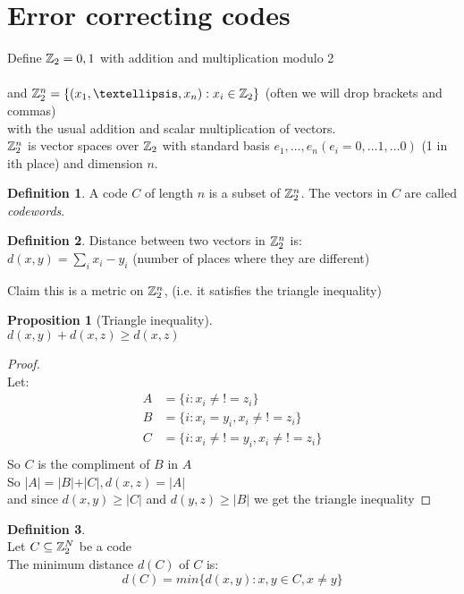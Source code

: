 \documentclass[]{article}
\newtheorem{prop}[thm]{Proposition}
\theoremstyle{definition}
\newtheorem*{defn}{Definition}
\theoremstyle{remark}
\numberwithin{equation}{section}
\begin{document}
\section{Error correcting codes}
	Define $\mathbb{Z}_2 = {0,1}$ with addition and multiplication modulo 2\\
	\\
	and $\ZZb^n = \{(x_1,…, x_n): x_i \in \ZZb\}$ (often we will drop brackets and commas)\\ with the usual addition and scalar multiplication of vectors.\\
	$\mathbb{Z}_2^n$ is vector spaces over $\mathbb{Z}_2$ with standard basis $e_1, …,e_n (e_i = 0,…1,…0)$ (1 in ith place) and dimension $n$.

	\begin{defn}
		 A code $C$ of length $n$ is a subset of $\mathbb{Z}_2^n$. The vectors in $C$ are called \emph{codewords}.
	\end{defn}
	\begin{defn}
		Distance between two vectors in $\mathbb{Z}_2^n$ is:\\
		$d(x,y) = \sum_i x_i - y_i$ (number of places where they are different)

	\end{defn}
	Claim this is a metric on $\mathbb{Z}_2^n$, (i.e. it satisfies the triangle inequality)
	\begin{prop}[Triangle inequality]\hfill\\
	$d(x,y) + d(x,z) \geq d(x,z)$
	\end{prop}
	\begin{proof}\hfill \\
	Let:\\
	\begin{align*}
		A &= \{i: x_i \neq{!=}z_i\}\\
		B &= \{i: x_i = y_i, x_i \neq{!=} z_i\}	\\
		C &= \{i: x_i \neq{!=} y_i, x_i \neq{!=} z_i\}\\
	\end{align*}
	So $C$ is the compliment of $B$ in $A$\\
	So |$A| = |B| + |C|, d(x,z) = |A|$\\
	and since $d(x,y) \geq |C|$ and $d(y,z) \geq|B|$ we get the triangle inequality
	\end{proof}

	\begin{defn}\hfill\\
	Let $C \subseteq \mathbb{Z}_2^N$ be a code\\
	The minimum distance $d(C)$ of $C$ is:\\
	\[
		d(C) = min \{ d(x,y): x,y \in C, x \neq y\}
	\]
	\end{defn}
\end{document}

